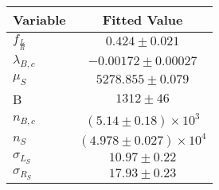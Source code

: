 \begin{tabular}[t]{lc}
\hline
Variable &Fitted Value\\
\hline\hline
$f_{\frac{L}{R}}$&$0.424\pm0.021$\\
\hline
$\lambda_{B,c}$&$-0.00172\pm0.00027$\\
\hline
$\mu_S$&$5278.855\pm0.079$\\
\hline
B&$1312\pm46$\\
\hline
$n_{B,c}$&$(5.14\pm0.18)\times 10^3$\\
\hline
$n_S$&$(4.978\pm0.027)\times 10^4$\\
\hline
$\sigma_{L_S}$&$10.97\pm0.22$\\
\hline
$\sigma_{R_S}$&$17.93\pm0.23$\\
\hline
\end{tabular}